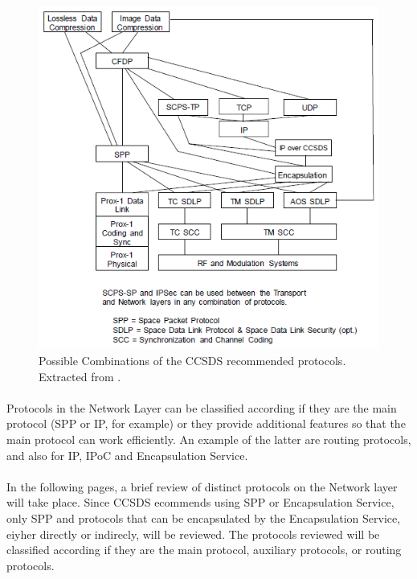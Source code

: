 \documentclass[12pt,a4paper]{report}
\begin{document}
\begin{figure}[H]
\begin{center}
\includegraphics[scale=1]{CCSDScombinations.PNG}
\caption[Combination of CCSDS Recommended Protocols]{Possible Combinations of the CCSDS recommended protocols. Extracted from \cite{CCSDSOverview}.}
\label{fig:CCSDScombinations}
\end{center}
\end{figure}
\paragraph{}Protocols in the Network Layer can be classified according if they are the main protocol (SPP or IP, for example) or they provide additional features so that the main protocol can work efficiently. An example of the latter are routing protocols, and also for IP, IPoC and Encapsulation Service.
\paragraph{}In the following pages, a brief review of distinct protocols on the Network layer will take place. Since CCSDS ecommends using SPP or Encapsulation Service, only SPP and protocols that can be encapsulated by the Encapsulation Service, eiyher directly or indirecly, will be reviewed. The protocols reviewed will be classified according if they are the main protocol, auxiliary protocols, or routing protocols.
\end{document}
